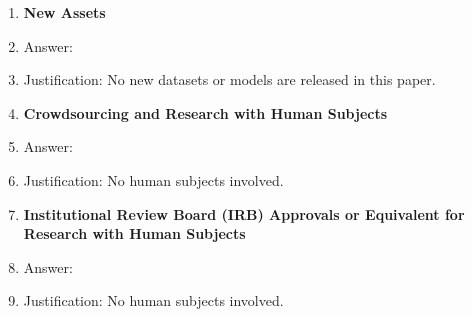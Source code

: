 \documentclass{article}
\begin{document}
\begin{enumerate}
\item {\bf New Assets}
    \item[] Answer: \answerNA{}
    \item[] Justification: No new datasets or models are released in this paper.

\item {\bf Crowdsourcing and Research with Human Subjects}
    \item[] Answer: \answerNA{}
    \item[] Justification: No human subjects involved.

\item {\bf Institutional Review Board (IRB) Approvals or Equivalent for Research with Human Subjects}
    \item[] Answer: \answerNA{}
    \item[] Justification: No human subjects involved.

\end{enumerate}
\end{document}
